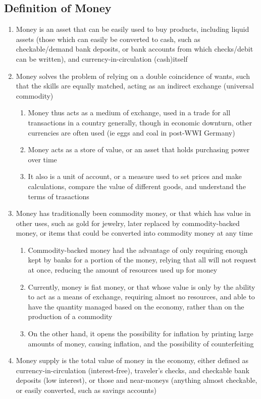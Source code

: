 \subsection{Definition of Money}
\begin{enumerate}
\item Money is an asset that can be easily used to buy products, including liquid assets (those which can easily be converted to cash, such as checkable/demand bank deposits, or bank accounts from which checks/debit can be written), and currency-in-circulation (cash)itself
\item Money solves the problem of relying on a double coincidence of wants, such that the skills are equally matched, acting as an indirect exchange (universal commodity)
\begin{enumerate}
\item Money thus acts as a medium of exchange, used in a trade for all transactions in a country generally, though in economic downturn, other currencies are often used (ie eggs and coal in post-WWI Germany)
\item Money acts as a store of value, or an asset that holds purchasing power over time
\item It also is a unit of account, or a measure used to set prices and make calculations, compare the value of different goods, and understand the terms of trasactions
\end{enumerate}
\item Money has traditionally been commodity money, or that which has value in other uses, such as gold for jewelry, later replaced by commodity-backed money, or items that could be converted into commodity money at any time
\begin{enumerate}
\item Commodity-backed money had the advantage of only requiring enough kept by banks for a portion of the money, relying that all will not request at once, reducing the amount of resources used up for money
\item Currently, money is fiat money, or that whose value is only by the ability to act as a means of exchange, requiring almost no resources, and able to have the quantity managed based on the economy, rather than on the production of a commodity
\item On the other hand, it opens the possibility for inflation by printing large amounts of money, causing inflation, and the possibility of counterfeiting
\end{enumerate}
\item Money supply is the total value of money in the economy, either defined as currency-in-circulation (interest-free), traveler's checks, and checkable bank deposits (low interest), or those and near-moneys (anything almost checkable, or easily converted, such as savings accounts)

\end{enumerate}
